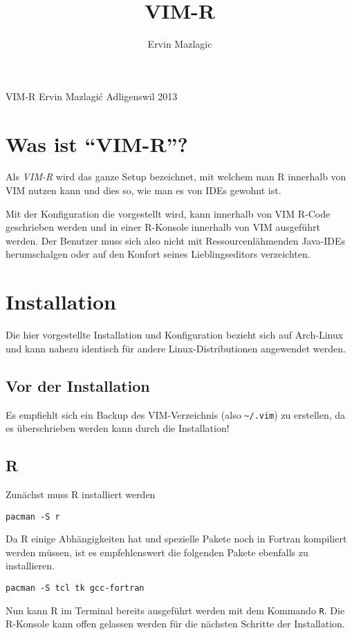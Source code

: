 \documentclass[a4paper,
               10pt,
               fleqn]{article}
\author{Ervin Mazlagic}
\title{VIM-R}
\begin{document}
         {VIM-R}
         {Ervin Mazlagi\'c}
         {Adligenswil}
         {2013}

\tableofcontents
\newpage

\section{Was ist ``VIM-R''?}
Als \emph{VIM-R} wird das ganze Setup bezeichnet, mit welchem man R innerhalb
von VIM nutzen kann und dies so, wie man es von IDEs gewohnt ist.

Mit der Konfiguration die vorgestellt wird, kann innerhalb von VIM R-Code
geschrieben werden und in einer R-Konsole innerhalb von VIM ausgeführt werden.
Der Benutzer muss sich also nicht mit Ressourcenlähmenden Java-IDEs
herumschalgen oder auf den Konfort seines Lieblingseditors verzeichten.

\section{Installation}
Die hier vorgestellte Installation und Konfiguration bezieht sich auf 
Arch-Linux und kann nahezu identisch für andere Linux-Distributionen 
angewendet werden.

\subsection{Vor der Installation}
Es empfiehlt sich ein Backup des VIM-Verzeichnis (also \verb!~/.vim!) zu 
erstellen, da es überschrieben werden kann durch die Installation!

\subsection{R}
Zunächst muss R installiert werden
\begin{lstlisting}
pacman -S r
\end{lstlisting}
Da R einige Abhängigkeiten hat und spezielle Pakete noch in Fortran 
kompiliert werden müssen, ist es empfehlenswert die folgenden Pakete
ebenfalls zu installieren.
\begin{lstlisting}
pacman -S tcl tk gcc-fortran
\end{lstlisting}
Nun kann R im Terminal bereits ausgeführt werden mit dem Kommando
\verb!R!. Die R-Konsole kann offen gelassen werden für die nächsten 
Schritte der Installation.
\end{document}
